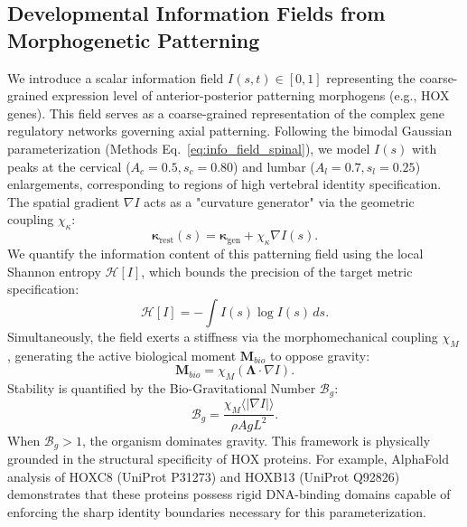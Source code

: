 \documentclass[11pt,a4paper]{article}
\newcommand{\ShannonH}{\mathcal{H}}
\begin{document}
\subsection{Developmental Information Fields from Morphogenetic Patterning}

We introduce a scalar information field $I(s, t) \in [0, 1]$ representing the coarse-grained expression level of anterior-posterior patterning morphogens (e.g., HOX genes). This field serves as a coarse-grained representation of the complex gene regulatory networks governing axial patterning. Following the bimodal Gaussian parameterization (Methods Eq.~\ref{eq:info_field_spinal}), we model $I(s)$ with peaks at the cervical ($A_c=0.5, s_c=0.80$) and lumbar ($A_l=0.7, s_l=0.25$) enlargements, corresponding to regions of high vertebral identity specification. The spatial gradient $\nabla I$ acts as a "curvature generator" via the geometric coupling $\chi_\kappa$:
\begin{equation}
\boldsymbol{\kappa}_{\mathrm{rest}}(s) = \boldsymbol{\kappa}_{\mathrm{gen}} + \chi_\kappa \nabla I(s).
\label{eq:kappa_rest}
\end{equation}
We quantify the information content of this patterning field using the local Shannon entropy $\ShannonH[I]$, which bounds the precision of the target metric specification:
\begin{equation}
\ShannonH[I] = -\int I(s) \log I(s) \, ds.
\label{eq:shannon_entropy}
\end{equation}
Simultaneously, the field exerts a stiffness via the morphomechanical coupling $\chi_M$, generating the active biological moment $\mathbf{M}_{bio}$ to oppose gravity:
\begin{equation}
\mathbf{M}_{bio} = \chi_M (\mathbf{\Lambda} \cdot \nabla I).
\label{eq:active_moment}
\end{equation}
Stability is quantified by the Bio-Gravitational Number $\mathcal{B}_g$:
\begin{equation}
\mathcal{B}_g = \frac{\chi_M \langle |\nabla I| \rangle}{\rho A g L^2}.
\label{eq:bg_number}
\end{equation}
When $\mathcal{B}_g > 1$, the organism dominates gravity. This framework is physically grounded in the structural specificity of HOX proteins. For example, AlphaFold analysis of HOXC8 (UniProt P31273) and HOXB13 (UniProt Q92826) demonstrates that these proteins possess rigid DNA-binding domains capable of enforcing the sharp identity boundaries necessary for this parameterization.
\end{document}
